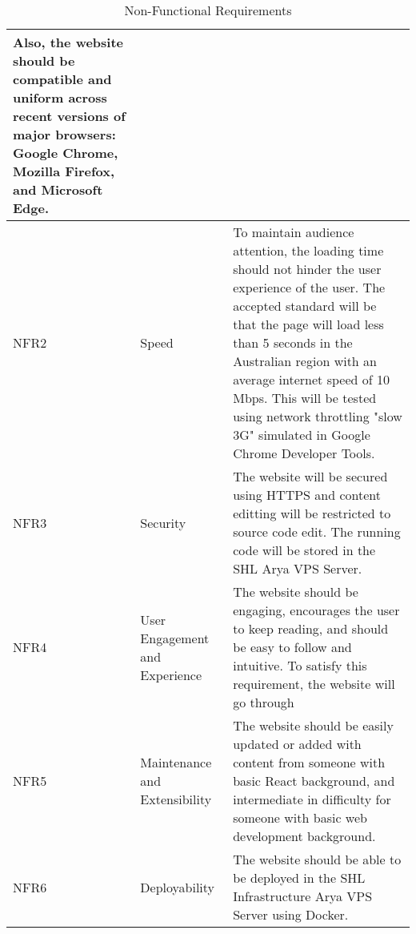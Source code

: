 \begin{table}[htp]
\begin{center}
\begin{longtable}{ p{2cm} | p{5cm} | p{9cm} }
Also, the website should be compatible and uniform across recent versions of major browsers: Google Chrome, Mozilla Firefox, and Microsoft Edge.\\ \hline
\fussy NFR2 & \fussy Speed & \fussy To maintain audience attention, the loading time should not hinder the user experience of the user. The accepted standard will be that the page will load less than 5 seconds in the Australian region with an average internet speed of 10 Mbps. This will be tested using network throttling "slow 3G" simulated in Google Chrome Developer Tools.\\ \hline
\fussy NFR3 & \fussy Security & \fussy The website will be secured using HTTPS and content editting will be restricted to source code edit. The running code will be stored in the SHL Arya VPS Server.\\ \hline
\fussy NFR4 & \fussy User Engagement and Experience & \fussy The website should be engaging, encourages the user to keep reading, and should be easy to follow and intuitive. To satisfy this requirement, the website will go through  \\ \hline
\fussy NFR5 & \fussy Maintenance and Extensibility & \fussy The website should be easily updated or added with content from someone with basic React background, and intermediate in difficulty for someone with basic web development background. \\ \hline
\fussy NFR6 & \fussy Deployability & \fussy The website should be able to be deployed in the SHL Infrastructure Arya VPS Server using Docker. \\ \hline


\end{longtable} \label{issues.}
\caption{Non-Functional Requirements} \label{issues}
\end{center}
\end{table}
